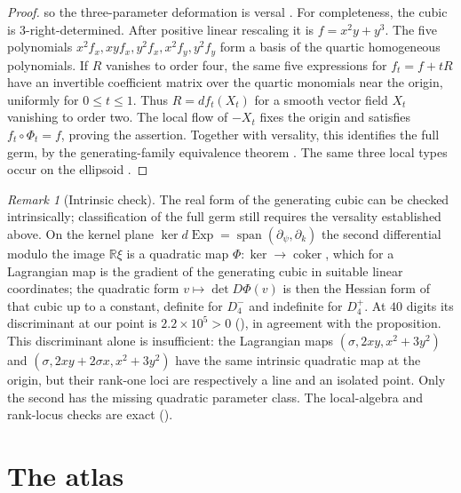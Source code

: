 \documentclass[11pt]{article}
\theoremstyle{remark}
\newtheorem{remark}[theorem]{Remark}
\newcommand{\Exp}{\operatorname{Exp}}
\begin{document}
\begin{proof}
so the three-parameter deformation is versal
\cite[Ch.~5, \S2.5, pp.~98--99]{ArnoldGivental1990Symplectic}.
For completeness, the cubic is $3$-right-determined.  After positive
linear rescaling it is $f=x^2y+y^3$.  The five polynomials
$x^2f_x,xyf_x,y^2f_x,x^2f_y,y^2f_y$ form a basis of the quartic
homogeneous polynomials.  If $R$ vanishes to order four, the same five
expressions for $f_t=f+tR$ have an invertible coefficient matrix over
the quartic monomials near the origin, uniformly for $0\le t\le1$.
Thus $R=df_t(X_t)$ for a smooth vector field $X_t$ vanishing to order
two.  The local flow of $-X_t$ fixes the origin and satisfies
$f_t\circ\Phi_t=f$, proving the assertion.  Together with versality,
this identifies the full germ, by the generating-family equivalence
theorem \cite[Ch.~5, \S1.4, p.~93]{ArnoldGivental1990Symplectic}.
The same three local types occur on the ellipsoid \cite{ItohKiyohara2021}.
\end{proof}

\begin{remark}[Intrinsic check]\label{rem:intrinsic}
The real form of the generating cubic can be checked intrinsically;
classification of the full germ still requires the versality established
above.  On the kernel plane
$\ker d\Exp=\operatorname{span}(\partial_\psi,\partial_k)$ the second
differential modulo the image $\mathbb R\xi$ is a quadratic map
$\Phi:\ker\to\operatorname{coker}$, which for a Lagrangian map is the
gradient of the generating cubic in suitable linear coordinates; the
quadratic form $v\mapsto\det D\Phi(v)$ is then the Hessian form of that
cubic up to a constant, definite for $D_4^-$ and indefinite for $D_4^+$.
At $40$ digits its discriminant at our point is $2.2\times10^5>0$
(), in agreement with the proposition.
This discriminant alone is insufficient: the Lagrangian maps
$(\sigma,2xy,x^2+3y^2)$ and $(\sigma,2xy+2\sigma x,x^2+3y^2)$
have the same intrinsic quadratic map at the origin, but their rank-one
loci are respectively a line and an isolated point.  Only the second
has the missing quadratic parameter class.  The local-algebra and
rank-locus checks are exact ().
\end{remark}

\section{The atlas}\label{sec:atlas}
\end{document}
